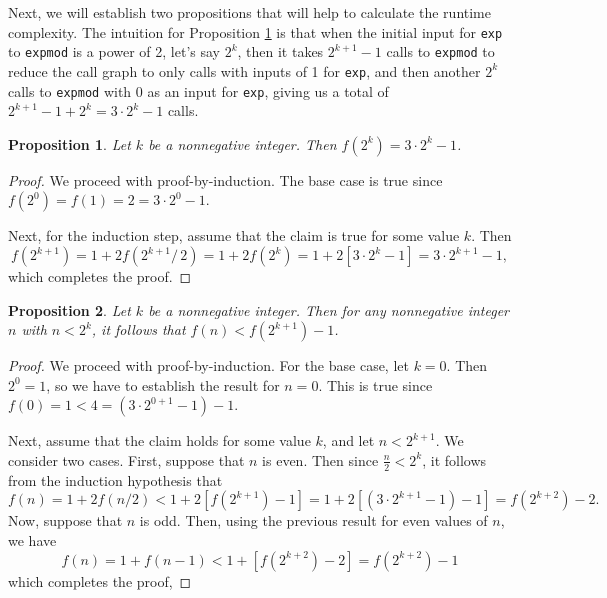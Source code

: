 \documentclass{article}
\newtheorem{proposition}{Proposition}
\begin{document}
Next, we will establish two propositions that will help to calculate the runtime
complexity.  The intuition for Proposition \ref{thm:f-powers-of-two} is that
when the initial input for \lstinline{exp} to \lstinline{expmod} is a power of
2, let's say $2^k$, then it takes $2^{k + 1} - 1$ calls to \lstinline{expmod} to
reduce the call graph to only calls with inputs of 1 for \lstinline{exp}, and
then another $2^k$ calls to \lstinline{expmod} with 0 as an input for
\lstinline{exp}, giving us a total of $2^{k + 1} - 1 + 2^k = 3 \cdot 2^k - 1$
calls.

\begin{proposition}
  \label{thm:f-powers-of-two}
  Let $k$ be a nonnegative integer.  Then $f(2^k) = 3 \cdot 2^k - 1$.
\end{proposition}

\begin{proof}
  We proceed with proof-by-induction.  The base case is true since
  $f(2^0) = f(1) = 2 = 3 \cdot 2^0 - 1$.

  Next, for the induction step, assume that the claim is true for some value
  $k$.  Then
  \begin{equation*}
    f(2^{k + 1})
    = 1 + 2f(2^{k + 1} /\, 2)
    = 1 + 2f(2^k)
    = 1 + 2 \left[3 \cdot 2^k - 1 \right]
    = 3 \cdot 2^{k + 1} - 1,
  \end{equation*}
  which completes the proof.
\end{proof}

\begin{proposition}
  Let $k$ be a nonnegative integer.  Then for any nonnegative integer $n$ with
  $n < 2^k$, it follows that $f(n) < f(2^{k + 1}) - 1$.
\end{proposition}

\begin{proof}
  We proceed with proof-by-induction.  For the base case, let $k = 0$.  Then
  $2^0 = 1$, so we have to establish the result for $n = 0$.  This is true since
  $f(0) = 1 < 4 = (3 \cdot 2^{0 + 1} - 1) - 1$.

  Next, assume that the claim holds for some value $k$, and let $n < 2^{k + 1}$.
  We consider two cases.  First, suppose that $n$ is even.  Then since
  $\frac{n}{2} < 2^k$, it follows from the induction hypothesis that
  \begin{equation*}
    f(n)
    = 1 + 2 f(n/2)
    < 1 + 2 \left[ f(2^{k + 1}) - 1 \right]
    = 1 + 2\left[ (3 \cdot 2^{k + 1} - 1) - 1 \right]
    = f(2^{k + 2}) - 2.
  \end{equation*}
  Now, suppose that $n$ is odd.  Then, using the previous result for even values
  of $n$, we have
  \begin{equation*}
    f(n)
    = 1 + f(n - 1)
    < 1 + \left[ f(2^{k + 2}) - 2 \right]
    = f(2^{k + 2}) - 1
  \end{equation*}
  which completes the proof,
\end{proof}
\end{document}
